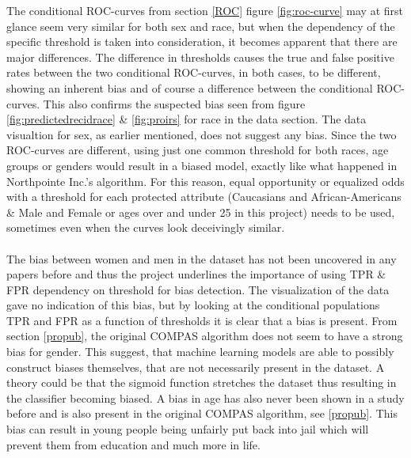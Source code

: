 \documentclass[11pt, fleqn, titlepage]{article}
\begin{document}
	The conditional ROC-curves from section \ref{ROC} figure \ref{fig:roc-curve} may at first glance seem very similar for both sex and race, but when the dependency of the specific threshold is taken into consideration, it becomes apparent that there are major differences. The difference in thresholds causes the true and false positive rates between the two conditional ROC-curves, in both cases, to be different, showing an inherent bias and of course a difference between the conditional ROC-curves. This also confirms the suspected bias seen from figure \ref{fig:predictedrecidrace} \& \ref{fig:proirs} for race in the data section. The data visualtion for sex, as earlier mentioned, does not suggest any bias. Since the two ROC-curves are different, using just one common threshold for both races, age groups or genders would result in a biased model, exactly like what happened in Northpointe Inc.'s algorithm. For this reason, equal opportunity or equalized odds with a threshold for each protected attribute (Caucasians and African-Americans \& Male and Female or ages over and under 25 in this project) needs to be used, sometimes even when the curves look deceivingly similar. \\\\
	\noindent
	The bias between women and men in the dataset has not been uncovered in any papers before and thus the project underlines the importance of using TPR \& FPR dependency on threshold for bias detection. The visualization of the data gave no indication of this bias, but by looking at the conditional populations TPR and FPR as a function of thresholds it is clear that a bias is present. From section \ref{propub}, the original COMPAS algorithm does not seem to have a strong bias for gender. This suggest, that machine learning models are able to possibly construct biases themselves, that are not necessarily present in the dataset. A theory could be that the sigmoid function stretches the dataset thus resulting in the classifier becoming biased. A bias in age has also never been shown in a study before and is also present in the original COMPAS algorithm, see \ref{propub}. This bias can result in young people being unfairly put back into jail which will prevent them from education and much more in life. \\\\ 
	\noindent
\end{document}
